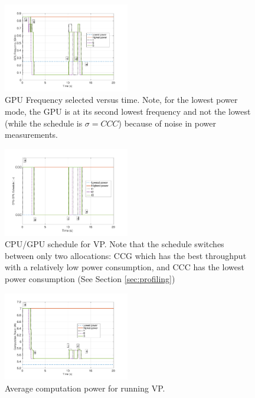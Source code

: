 \begin{figure}[t]
\centering
\includegraphics[width=0.49\textwidth]{../simulations/figs/GPUF.pdf}
\vspace{-20pt}
\caption{GPU Frequency selected versus time. Note, for the lowest power mode, the GPU is at its second lowest frequency and not the lowest (while the schedule is $\sigma=CCC$) because of noise in power measurements.}
\label{fig:gpuf} 
\end{figure}


\begin{figure}[t]
\centering
\includegraphics[width=0.49\textwidth]{../simulations/figs/schedule.pdf}
\vspace{-20pt}
\caption{CPU/GPU schedule for VP. Note that the schedule switches between only two allocations: CCG which has the best throughput with a relatively low power consumption,  and CCC has the lowest power consumption (See Section \ref{sec:profiling})}
\label{fig:schedule} 
\end{figure}

\begin{figure}[t]
\centering
\includegraphics[width=0.49\textwidth]{../simulations/figs/power.pdf}
\vspace{-20pt}
\caption{Average computation power for running VP.}
\label{fig:power} 
\end{figure}

